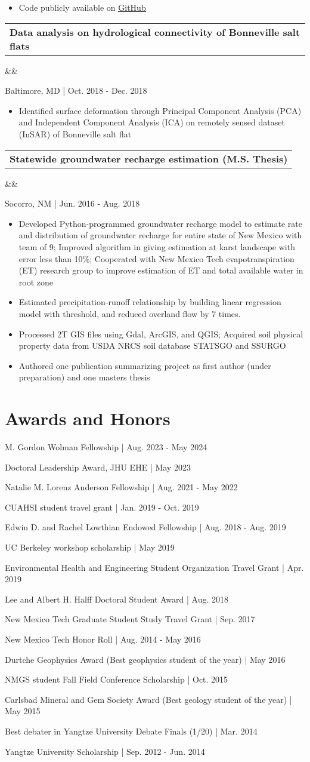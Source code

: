 \documentclass[12pt,letterpaper,sans]{moderncv}        %
\makeatletter
\newcommand*{\customcvproject}[4][.25em]{
  \begin{tabular}{@{}l} 
    {\bfseries #2} { #3}
  \end{tabular}


      

  \ifx&#4&%
  \else{\\%
    \begin{minipage}{\maincolumnwidth}%
      \small#4%
    \end{minipage}}\fi%
  \par\addvspace{#1}}
\newcommand*{\award}[3][.25em]{

    { #2} {| #3}


    

  \par\addvspace{#1}}
\makeatother
\begin{document}
{\begin{itemize}
\item Code publicly available on \href{https://github.com/Estherrrrrxu/CHEMMA}{\underline{GitHub}}
\end{itemize}

{\customcvproject{Data analysis on hydrological connectivity of Bonneville salt flats}{}
{}
}
Baltimore, MD | Oct. 2018 - Dec. 2018
\begin{itemize}
  \item Identified surface deformation through Principal Component Analysis (PCA) and Independent Component Analysis (ICA) on remotely sensed dataset (InSAR) of Bonneville salt flat
\end{itemize}

{\customcvproject{Statewide groundwater recharge estimation (M.S. Thesis)}{}{}}
Socorro, NM | Jun. 2016 - Aug. 2018
\begin{itemize}
    \item Developed Python-programmed groundwater recharge model to estimate rate and distribution of groundwater recharge for entire state of New Mexico with team of 9; Improved algorithm in giving estimation at karst landscape with error less than 10\%; Cooperated with New Mexico Tech evapotranspiration (ET) research group to improve estimation of ET and total available water in root zone
    \item Estimated precipitation-runoff relationship by building linear regression model with threshold, and reduced overland flow by 7 times.
    \item Processed 2T GIS files using Gdal, ArcGIS, and QGIS; Acquired soil physical property data from USDA NRCS soil database STATSGO and SSURGO
    \item Authored one publication summarizing project as first author (under preparation) and one masters thesis \cite{masterthesis}
  \end{itemize}
  
\section{Awards and Honors}
\award{M. Gordon Wolman Fellowship}{Aug. 2023 - May 2024}
\award{Doctoral Leadership Award, JHU EHE}{May 2023}
\award{Natalie M. Lorenz Anderson Fellowship}{Aug. 2021 - May 2022}
\award{CUAHSI student travel grant}{Jan. 2019 - Oct. 2019}
\award{Edwin D. and Rachel Lowthian Endowed Fellowship}{Aug. 2018 - Aug. 2019}
\award{UC Berkeley workshop scholarship}{May 2019}
\award{Environmental Health and Engineering Student Organization Travel Grant}{Apr. 2019}
\award{Lee and Albert H. Halff Doctoral Student Award}{Aug. 2018}
\award{New Mexico Tech Graduate Student Study Travel Grant}{Sep. 2017}
\award{New Mexico Tech Honor Roll}{Aug. 2014 - May 2016}
\award{Durtche Geophysics Award (Best geophysics student of the year)}{May 2016}
\award{NMGS student Fall Field Conference Scholarship}{Oct. 2015}
\award{Carlsbad Mineral and Gem Society Award (Best geology student of the year)}{May 2015}
\award{Best debater in Yangtze University Debate Finals (1/20)}{Mar. 2014}
\award{Yangtze University Scholarship}{Sep. 2012 - Jun. 2014}

}
\end{document}
